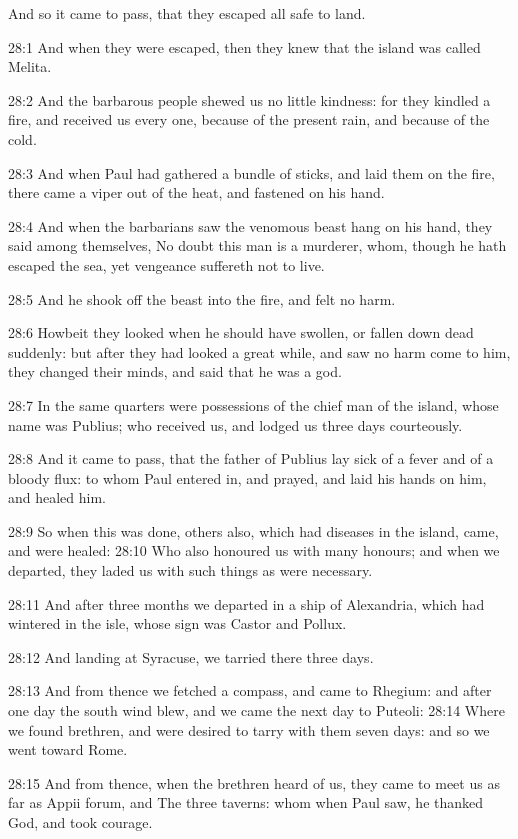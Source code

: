 And so it came to pass, that they escaped all safe to land.

28:1 And when they were escaped, then they knew that the island was called Melita.

28:2 And the barbarous people shewed us no little kindness: for they kindled a fire, and received us every one, because of the present rain, and because of the cold.

28:3 And when Paul had gathered a bundle of sticks, and laid them on the fire, there came a viper out of the heat, and fastened on his hand.

28:4 And when the barbarians saw the venomous beast hang on his hand, they said among themselves, No doubt this man is a murderer, whom, though he hath escaped the sea, yet vengeance suffereth not to live.

28:5 And he shook off the beast into the fire, and felt no harm.

28:6 Howbeit they looked when he should have swollen, or fallen down dead suddenly: but after they had looked a great while, and saw no harm come to him, they changed their minds, and said that he was a god.

28:7 In the same quarters were possessions of the chief man of the island, whose name was Publius; who received us, and lodged us three days courteously.

28:8 And it came to pass, that the father of Publius lay sick of a fever and of a bloody flux: to whom Paul entered in, and prayed, and laid his hands on him, and healed him.

28:9 So when this was done, others also, which had diseases in the island, came, and were healed: 28:10 Who also honoured us with many honours; and when we departed, they laded us with such things as were necessary.

28:11 And after three months we departed in a ship of Alexandria, which had wintered in the isle, whose sign was Castor and Pollux.

28:12 And landing at Syracuse, we tarried there three days.

28:13 And from thence we fetched a compass, and came to Rhegium: and after one day the south wind blew, and we came the next day to Puteoli: 28:14 Where we found brethren, and were desired to tarry with them seven days: and so we went toward Rome.

28:15 And from thence, when the brethren heard of us, they came to meet us as far as Appii forum, and The three taverns: whom when Paul saw, he thanked God, and took courage.


